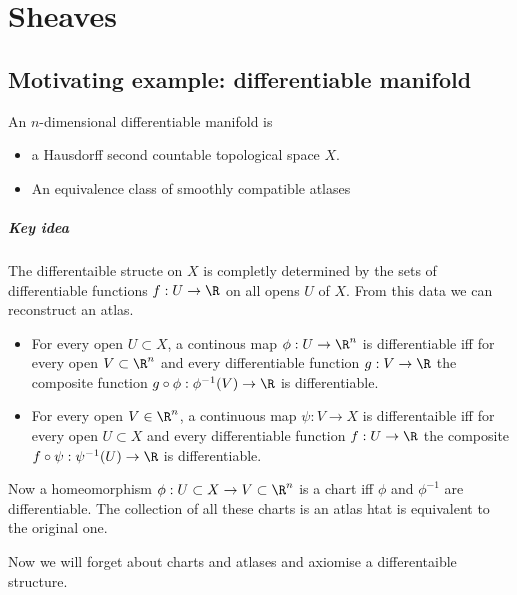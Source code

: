 \chapter{Sheaves} \label{chap:sheaves}
\section{Motivating example: differentiable manifold} \label{sec:motivating_example:_differentiable_manifold}
\begin{definition}
	An $n$-dimensional differentiable manifold is 
	\begin{itemize}
		\item a Hausdorff second countable topological space $X$. 
		\item An equivalence class of smoothly compatible atlases
	\end{itemize}
\end{definition}
\paragraph{Key idea} The differentaible structe on $X$ is completly determined by the sets of differentiable functions $f: U \to \R$ on all opens $U $ of $X$. 
From this data we can reconstruct an atlas. 
\begin{itemize}
	\item For every open  $U \subset X$, a continous map $\phi: U \to \R^{n}$ is differentiable iff for every open $V \subset \R^{n}$ and every differentiable function $g: V \to \R$ the composite function $g \circ \phi: \phi^{-1}(V) \to \R$ is differentiable. 
	\item For every open $V \in \R^{n}$, a continuous map $\psi: V \to X$ is differentaible iff for every open $U \subset X$  and every differentiable function  $f: U \to \R$ the composite $f\circ \psi: \psi^{-1}(U) \to \R$ is differentiable.
\end{itemize}
Now a homeomorphism $\phi: U \subset  X \to  V \subset  \R^{n}$ is a chart iff $\phi$ and $\phi^{-1}$ are differentiable.
The collection of all these charts is an atlas htat is equivalent to the original one.

Now we will forget about charts and atlases and axiomise a differentaible structure.

